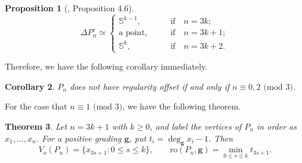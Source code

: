 \documentclass[dvipsnames,10pt]{article}
\newtheorem{theorem}{Theorem}[section]
\newtheorem{proposition}[theorem]{Proposition}
\newtheorem{cor}[theorem]{Corollary}
\begin{document}
\begin{proposition}[\cite{kozlov1999complexes}, Proposition 4.6]
\begin{equation*}
    \Delta P_n^c\simeq \left\{\begin{matrix}
 \mathbb{S}^{k-1},\qquad &\text{if}\quad  n=3k;\\
 \text{a point,}\qquad &\text{if}\quad  n=3k+1;\\
 \mathbb{S}^k,\qquad &\text{if}\quad  n=3k+2.
\end{matrix}\right.
\end{equation*}
\end{proposition}
 Therefore, we have the following corollary immediately.
 \begin{cor}
     $P_n$ does not have regularity offset if and only if $n\equiv0,2$ $(\mathrm{mod}$ $3)$.
 \end{cor}
For the case that $n\equiv1$ $(\mathrm{mod}$ $3)$, we have the following theorem.
\begin{theorem}
    Let $n=3k+1$ with $k\geq0$, and label the vertices of $P_n$ in order as $x_1,\ldots,x_n$. For a positive grading $\mathbf{g}$, put $t_i=\deg_{\mathbf{g}}x_i-1$. Then
    \[
        V_o(P_n)=\{x_{3s+1}:0\leq s\leq k\},\qquad
        \mathrm{ro}(P_n,\mathbf{g})=\min_{0\leq s\leq k}t_{3s+1}.
    \]
\end{theorem}
\end{document}

